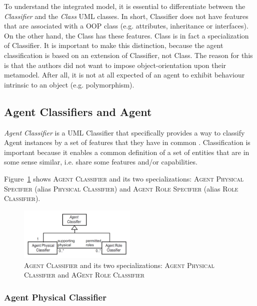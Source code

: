 To understand the integrated model, it is essential to differentiate between the \textit{Classifier} and the \textit{Class} UML classes.
In short, Classifier does not have features that are associated with a OOP class (e.g. attributes, inheritance or interfaces).
On the other hand, the Class has these features.
Class is in fact a specialization of Classifier.
It is important to make this distinction, because the agent classification is based on an extension of Classifier, not Class.
The reason for this is that the authors did not want to impose object-orientation upon their metamodel.
After all, it is not at all expected of an agent to exhibit behaviour intrinsic to an object (e.g. polymorphism). 

\subsection{Agent Classifiers and Agent}

\textit{Agent Classifier} is a UML Classifier that specifically provides a way to classify Agent instances by a set of features that they have in common \cite{Odell05}.
Classification is important because it enables a common definition of a set of entities that are in some sense similar, i.e. share some features and/or capabilities.

Figure~\ref{figure:onp-agent-classifiers} shows \textsc{Agent Classifier} and its two specializations: \textsc{Agent Physical Specifier} (alias \textsc{Physical Classifier}) and \textsc{Agent Role Specifier} (alias \textsc{Role Classifier}).

\begin{figure}[ht]
	\centering
	\includegraphics[width=0.5\textwidth]{images/onp-agent-classifiers.png}
	\caption{\textsc{Agent Classifier} and its two specializations: \textsc{Agent Physical Classifier} and \textsc{AGent Role Classifier}}
	\label{figure:onp-agent-classifiers}
\end{figure}

\subsubsection*{Agent Physical Classifier}

